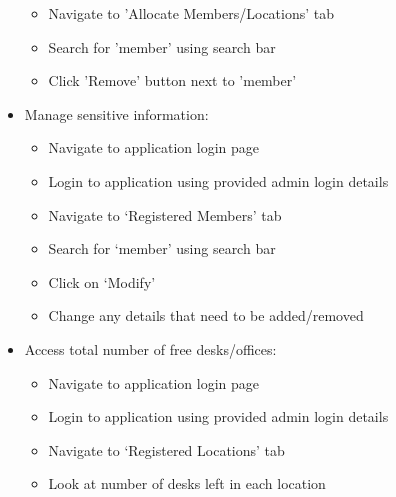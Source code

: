 \documentclass[11pt,a4paper]{article}
\begin{document}
\begin{itemize}
\begin{itemize}
        \item Navigate to 'Allocate Members/Locations' tab
        \item Search for 'member' using search bar
        \item Click 'Remove' button next to 'member'
    \end{itemize}
  \item Manage sensitive information:
    \begin{itemize}
      \item Navigate to application login page
      \item Login to application using provided admin login details
      \item Navigate to ‘Registered Members’ tab
      \item Search for ‘member’ using search bar
      \item Click on ‘Modify'
      \item Change any details that need to be added/removed
    \end{itemize}
  \item Access total number of free desks/offices:
    \begin{itemize}
      \item Navigate to application login page
      \item Login to application using provided admin login details
      \item Navigate to ‘Registered Locations’ tab
      \item Look at number of desks left in each location
    \end{itemize}
\end{itemize}
\end{document}
